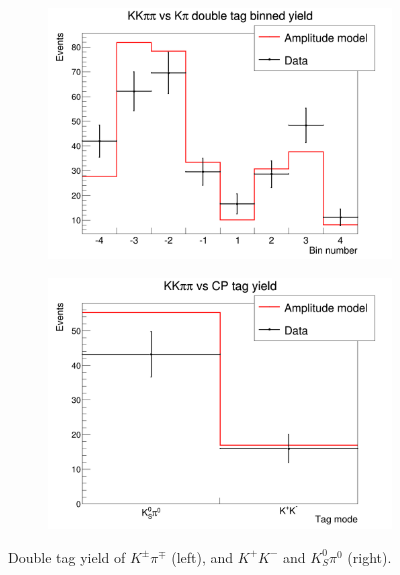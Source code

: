 \documentclass[12pt, a4paper, notitlepage, onecolumn]{article}
\begin{document}
\begin{figure}[H] 
  \centering
  \begin{subfigure}{0.5\textwidth}
    \centering
    \includegraphics[width=1\textwidth]{Plots/DoubleTagYieldFlavour.png}
  \end{subfigure}%
  \begin{subfigure}{0.5\textwidth}
    \centering
    \includegraphics[width=1\textwidth]{Plots/DoubleTagYieldInclusiveCP.png}
  \end{subfigure}
  \caption{Double tag yield of $K^\pm\pi^\mp$ (left), and $K^+K^-$ and $K_S^0\pi^0$ (right).}
  \label{fig_cpflavour_yield}
\end{figure}

\end{document}
